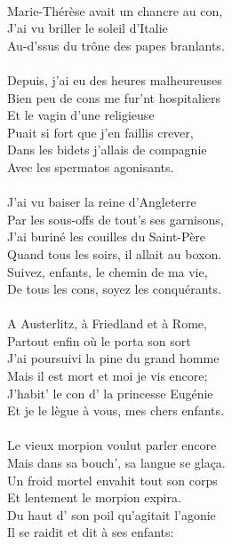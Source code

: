 \\Marie-Thérèse avait un chancre au con,
\\J'ai vu briller le soleil d'Italie
\\Au-d'ssus du trône des papes branlants.
\\\\Depuis, j'ai eu des heures malheureuses
\\Bien peu de cons me fur'nt hospitaliers
\\Et le vagin d'une religieuse
\\Puait si fort que j'en faillis crever,
\\Dans les bidets j'allais de compagnie
\\Avec les spermatos agonisants.
\\\\J'ai vu baiser la reine d'Angleterre
\\Par les sous-offs de tout's ses garnisons,
\\J'ai buriné les couilles du Saint-Père
\\Quand tous les soirs, il allait au boxon.
\\Suivez, enfants, le chemin de ma vie,
\\De tous les cons, soyez les conquérants.
\\\\A Austerlitz, à Friedland et à Rome,
\\Partout enfin où le porta son sort
\\J'ai poursuivi la pine du grand homme
\\Mais il est mort et moi je vis encore;
\\J'habit' le con d' la princesse Eugénie
\\Et je le lègue à vous, mes chers enfants.
\\\\Le vieux morpion voulut parler encore
\\Mais dans sa bouch', sa langue se glaça.
\\Un froid mortel envahit tout son corps
\\Et lentement le morpion expira.
\\Du haut d' son poil qu'agitait l'agonie
\\Il se raidit et dit à ses enfants:
\breakpage